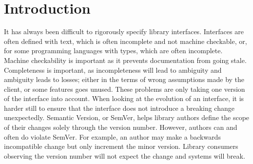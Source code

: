 \section{Introduction}







It has always been difficult to rigorously specify library interfaces.
Interfaces are often defined with text, which is often incomplete and not
machine checkable, or, for some programming languages with types, which are
often incomplete. Machine checkability is important as it prevents
documentation from going stale. Completeness is important, as incompleteness
will lead to ambiguity and ambiguity leads to losses; either in the terms of
wrong assumptions made by the client, or some features goes unused. These
problems are only taking one version of the interface into account. When
looking at the evolution of an interface, it is harder still to ensure that the
interface does not introduce a breaking change unexpectedly. Semantic Version, or
SemVer, helps library authors define the scope of their changes solely through
the version number. However, authors can and often do violate SemVer. For
example, an author may make a backwards incompatible change but only increment
the minor version. Library consumers observing the version number will not
expect the change and systems will break. 


